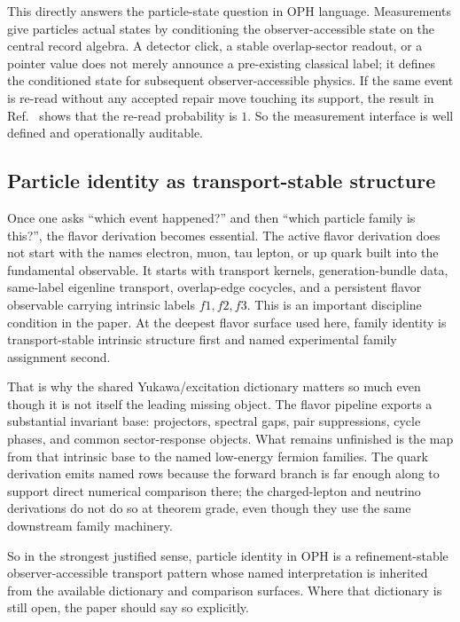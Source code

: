 \documentclass[11pt]{article}
\begin{document}
This directly answers the particle-state question in OPH language. Measurements give particles
actual states by conditioning the observer-accessible state on the central record algebra. A
detector click, a stable overlap-sector readout, or a pointer value does not merely announce a
pre-existing classical label; it defines the conditioned state for subsequent observer-accessible
physics. If the same event is re-read without any accepted repair move touching its support, the
result in Ref.~\cite{ophmicrophysics} shows that the re-read probability is \(1\). So the measurement interface is
well defined and operationally auditable.

\subsection{Particle identity as transport-stable structure}

Once one asks ``which event happened?'' and then ``which particle family is this?'', the
flavor derivation becomes essential. The active flavor derivation does not start with the
names electron, muon, tau lepton, or up quark built into the fundamental observable. It starts
with transport kernels, generation-bundle data, same-label eigenline transport, overlap-edge
cocycles, and a persistent flavor observable carrying intrinsic labels \(f1,f2,f3\). This is an
important discipline condition in the paper. At the deepest flavor surface used here, family
identity is transport-stable intrinsic structure first and named experimental family assignment
second.

That is why the shared Yukawa/excitation dictionary matters so much even though it is not
itself the leading missing object. The flavor pipeline exports a substantial invariant base:
projectors, spectral gaps, pair suppressions, cycle phases, and common sector-response objects.
What remains unfinished is the map from that intrinsic base to the named low-energy fermion
families. The quark derivation emits named rows because the forward branch is far enough along to
support direct numerical comparison there; the charged-lepton and neutrino derivations do not do
so at theorem grade, even though they use the same downstream family machinery.

So in the strongest justified sense, particle identity in OPH is a refinement-stable
observer-accessible transport pattern whose named interpretation is inherited from the
available dictionary and comparison surfaces. Where that dictionary is still open, the paper should say
so explicitly.
\end{document}

